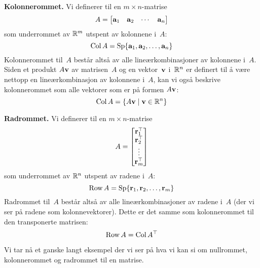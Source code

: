 \medskip\noindent\textbf{Kolonnerommet. }%
Vi definerer  til en $m \times n$-matrise
\[
A = \begin{bmatrix} \mathbf{a}_1 & \mathbf{a}_2 & \cdots & \mathbf{a}_n \end{bmatrix}
\]
som underrommet av $\mathbb{R}^m$ utspent av kolonnene i~$A$:
\[
\operatorname{Col} A = \operatorname{Sp} \{ \mathbf{a}_1, \mathbf{a}_2, \ldots, \mathbf{a}_n \}
\]
Kolonnerommet til~$A$ består altså av alle lineærkombinasjoner av
kolonnene i~$A$.  Siden et produkt $A \mathbf{v}$ av matrisen~$A$ og en
vektor~$\mathbf{v}$ i~$\mathbb{R}^n$ er definert til å være nettopp en
lineærkombinasjon av kolonnene i~$A$, kan vi også beskrive
kolonnerommet som alle vektorer som er på formen $A \mathbf{v}$:
\[
\operatorname{Col} A = \{ A \mathbf{v} \mid \mathbf{v} \in \mathbb{R}^n \}
\]

\medskip\noindent\textbf{Radrommet. }%
Vi definerer  til en $m \times n$-matrise
\[
A = \begin{bmatrix} \mathbf{r}_1^\top \\ \mathbf{r}_2^\top \\ \vdots \\ \mathbf{r}_m^\top \end{bmatrix}
\]
som underrommet av $\mathbb{R}^n$ utspent av radene i~$A$:
\[
\operatorname{Row} A = \operatorname{Sp} \{ \mathbf{r}_1, \mathbf{r}_2, \ldots, \mathbf{r}_m \}
\]
Radrommet til~$A$ består altså av alle lineærkombinasjoner av radene
i~$A$ (der vi ser på radene som kolonnevektorer).  Dette er det samme
som kolonnerommet til den transponerte matrisen:
\[
\operatorname{Row} A = \operatorname{Col} A^\top
\]

Vi tar nå et ganske langt eksempel der vi ser på hva vi kan si om
nullrommet, kolonnerommet og rad\-rommet til en matrise.

